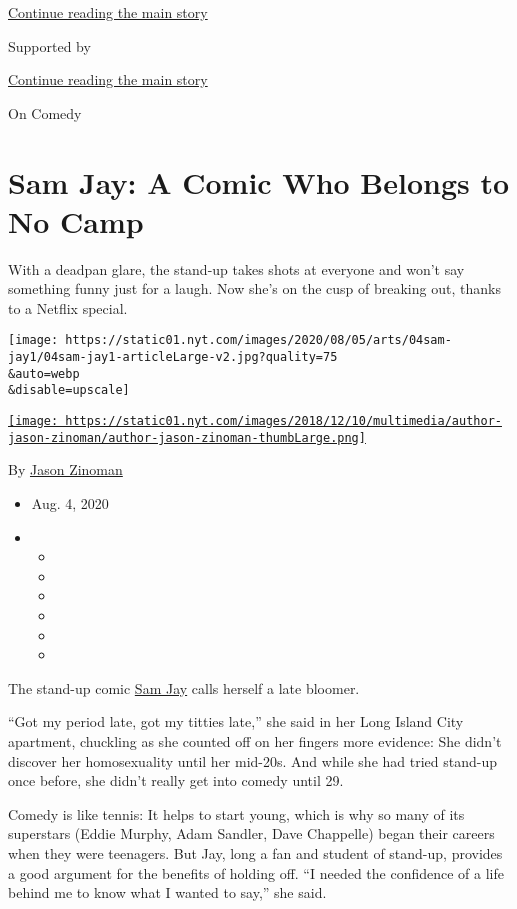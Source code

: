 \protect\hyperlink{after-top}{Continue reading the main story}

Supported by

\protect\hyperlink{after-sponsor}{Continue reading the main story}

On Comedy

\hypertarget{sam-jay-a-comic-who-belongs-to-no-camp}{%
\section{Sam Jay: A Comic Who Belongs to No
Camp}\label{sam-jay-a-comic-who-belongs-to-no-camp}}

With a deadpan glare, the stand-up takes shots at everyone and won't say
something funny just for a laugh. Now she's on the cusp of breaking out,
thanks to a Netflix special.

\texttt{[image: https://static01.nyt.com/images/2020/08/05/arts/04sam-jay1/04sam-jay1-articleLarge-v2.jpg?quality=75\\\&auto=webp\\\&disable=upscale]}

\href{https://www.nytimes.com/by/jason-zinoman}{\texttt{[image: https://static01.nyt.com/images/2018/12/10/multimedia/author-jason-zinoman/author-jason-zinoman-thumbLarge.png]}}

By \href{https://www.nytimes.com/by/jason-zinoman}{Jason Zinoman}

\begin{itemize}
\item
  Aug. 4, 2020
\item
  \begin{itemize}
  \item
  \item
  \item
  \item
  \item
  \item
  \end{itemize}
\end{itemize}

The stand-up comic \href{https://samjaycomic.com/}{Sam Jay} calls
herself a late bloomer.

``Got my period late, got my titties late,'' she said in her Long Island
City apartment, chuckling as she counted off on her fingers more
evidence: She didn't discover her homosexuality until her mid-20s. And
while she had tried stand-up once before, she didn't really get into
comedy until 29.

Comedy is like tennis: It helps to start young, which is why so many of
its superstars (Eddie Murphy, Adam Sandler, Dave Chappelle) began their
careers when they were teenagers. But Jay, long a fan and student of
stand-up, provides a good argument for the benefits of holding off. ``I
needed the confidence of a life behind me to know what I wanted to
say,'' she said.

